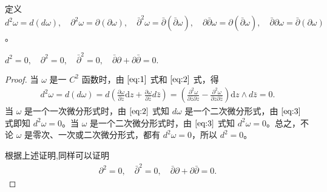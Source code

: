 \documentclass[../../main.tex]{subfiles}
\begin{document}
\begin{definition}
定义 \( d^2\omega = d(d\omega),\quad \partial^2\omega = \partial(\partial\omega),\quad \bar{\partial}^2\omega = \bar{\partial}(\bar{\partial}\omega),\quad \partial\bar{\partial}\omega = \partial(\bar{\partial}\omega) ,\quad \bar{\partial}\partial\omega = \bar{\partial}(\partial\omega) \)。
\end{definition}

\begin{proposition}
$d^2 = 0 , \quad\partial^2 = 0, \quad
\bar{\partial}^2 = 0, \quad
\bar{\partial}\partial + \partial\bar{\partial} = 0.$
\end{proposition}
\begin{proof}
当 \( \omega \) 是一 \( C^2 \) 函数时，由 \(\eqref{eq:1}\) 式和 \(\eqref{eq:2}\) 式，得
\begin{align*}
d^2\omega = d(d\omega) = d\left( \frac{\partial \omega}{\partial z}\mathrm{d}z + \frac{\partial \omega}{\partial \bar{z}}d\bar{z} \right) = \left( \frac{\partial^2 \omega}{\partial \bar{z}\partial z} - \frac{\partial^2 \omega}{\partial z\partial \bar{z}} \right) \mathrm{d}z \wedge d\bar{z} = 0. 
\end{align*}
当 \( \omega \) 是一个一次微分形式时，由 \(\eqref{eq:2}\) 式知 \( d\omega \) 是一个二次微分形式，由 \(\eqref{eq:3}\) 式即知 \( d^2\omega = 0 \)。当 \( \omega \) 是一个二次微分形式时，由 \(\eqref{eq:3}\) 式知 \( d^2\omega = 0 \)。总之，不论 \( \omega \) 是零次、一次或二次微分形式，都有 \( d^2\omega = 0 \)，所以 \( d^2 = 0 \)。

根据上述证明,同样可以证明
\begin{align*}
\partial^2 = 0, \quad
\bar{\partial}^2 = 0, \quad
\bar{\partial}\partial + \partial\bar{\partial} = 0. 
\end{align*}
\end{proof}
\end{document}
